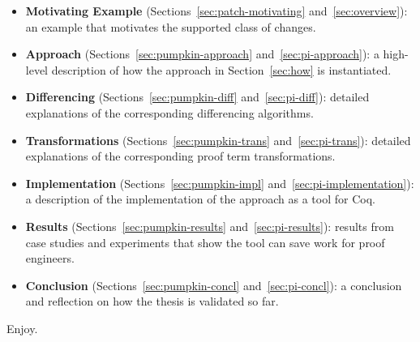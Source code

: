 \begin{itemize}
\item \textbf{Motivating Example} (Sections~\ref{sec:patch-motivating} and~\ref{sec:overview}):
an example that motivates the supported class of changes. 
\item \textbf{Approach} (Sections~\ref{sec:pumpkin-approach} and~\ref{sec:pi-approach}):
a high-level description of how the approach in Section~\ref{sec:how} is instantiated.
\item \textbf{Differencing} (Sections~\ref{sec:pumpkin-diff} and~\ref{sec:pi-diff}):
detailed explanations of the corresponding differencing algorithms.
\item \textbf{Transformations} (Sections~\ref{sec:pumpkin-trans} and~\ref{sec:pi-trans}):
detailed explanations of the corresponding proof term transformations.
\item \textbf{Implementation} (Sections~\ref{sec:pumpkin-impl} and~\ref{sec:pi-implementation}):
a description of the implementation of the approach as a tool for Coq.
\item \textbf{Results} (Sections~\ref{sec:pumpkin-results} and~\ref{sec:pi-results}):
results from case studies and experiments that show the tool can save work for proof engineers.
\item \textbf{Conclusion} (Sections~\ref{sec:pumpkin-concl} and~\ref{sec:pi-concl}):
a conclusion and reflection on how the thesis is validated so far.
\end{itemize}
Enjoy.

